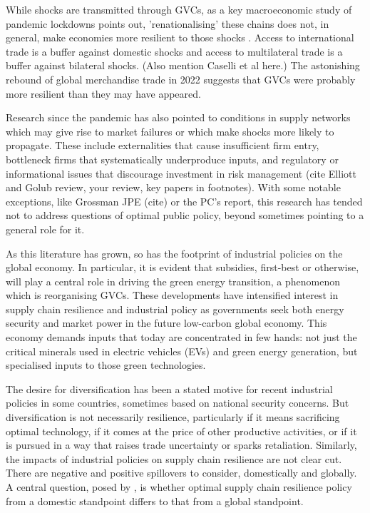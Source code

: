 \documentclass{article}
\begin{document}
While shocks are transmitted through GVCs, as a key macroeconomic study of pandemic lockdowns points out, 'renationalising' these chains does not, in general, make economies more resilient to those shocks \parencite{bonadio_global_2021}. Access to international trade is a buffer against domestic shocks and access to multilateral trade is a buffer against bilateral shocks. (Also mention Caselli et al here.) The astonishing rebound of global merchandise trade in 2022 suggests that GVCs were probably more resilient than they may have appeared.

Research since the pandemic has also pointed to conditions in supply networks which may give rise to market failures or which make shocks more likely to propagate. These include externalities that cause insufficient firm entry, bottleneck firms that systematically underproduce inputs, and regulatory or informational issues that discourage investment in risk management (cite Elliott and Golub review, your review, key papers in footnotes). With some notable exceptions, like Grossman JPE (cite) or the PC's report, this research has tended not to address questions of optimal public policy, beyond sometimes pointing to a general role for it.

As this literature has grown, so has the footprint of industrial policies on the global economy. In particular, it is evident that subsidies, first-best or otherwise, will play a central role in driving the green energy transition, a phenomenon which is reorganising GVCs. These developments have intensified interest in supply chain resilience and industrial policy as governments seek both energy security and market power in the future low-carbon global economy. This economy demands inputs that today are concentrated in few hands: not just the critical minerals used in electric vehicles (EVs) and green energy generation, but specialised inputs to those green technologies.

The desire for diversification has been a stated motive for recent industrial policies in some countries, sometimes based on national security concerns. But diversification is not necessarily resilience, particularly if it means sacrificing optimal technology, if it comes at the price of other productive activities, or if it is pursued in a way that raises trade uncertainty or sparks retaliation. Similarly, the impacts of industrial policies on supply chain resilience are not clear cut. There are negative and positive spillovers to consider, domestically and globally. A central question, posed by \textcite{bown_modern_2024}, is whether optimal supply chain resilience policy from a domestic standpoint differs to that from a global standpoint.
\end{document}
